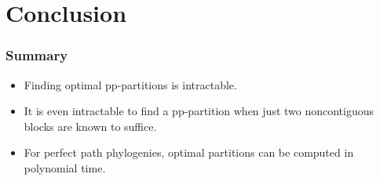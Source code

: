 
\section*{Conclusion}

\begin{frame}
  \frametitle<presentation>{Summary}

  \begin{itemize}
  \item
    Finding optimal pp-partitions is \alert{intractable}. 
  \item
    It is even intractable to find a pp-partition when \alert{just two 
      noncontiguous  blocks are known to suffice}.
  \item
    For perfect \alert{path} phylogenies, optimal partitions can be
    computed \alert{in polynomial time}.
  \end{itemize}

\end{frame}

